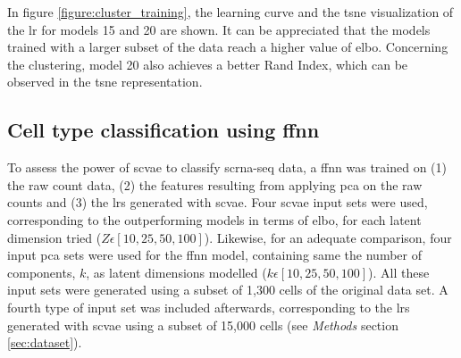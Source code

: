 \documentclass{article}
\begin{document}
\noindent In figure \ref{figure:cluster_training}, the learning curve and the \gls{tsne} visualization of the \gls{lr} for models 15 and 20 are shown. 
It can be appreciated that the models trained with a larger subset of the data reach a higher value of \gls{elbo}. 
Concerning the clustering, model 20 also achieves a better Rand Index, which can be observed in the \gls{tsne} representation.\\






\subsection{Cell type classification using \gls{ffnn}}
\label{sec:results_ffnn}

\noindent To assess the power of \gls{scvae} to classify \gls{scrna-seq} data, a \gls{ffnn} was trained on (1) the raw count data, (2) the features resulting from applying \gls{pca} on the raw counts and (3) the \glspl{lr} generated with \gls{scvae}.
Four \gls{scvae} input sets were used, corresponding to the outperforming models in terms of \gls{elbo}, for each latent dimension tried ($Z\epsilon[10, 25, 50, 100]$). 
Likewise, for an adequate comparison, four input \gls{pca} sets were used for the \gls{ffnn} model, containing same the number of components, $k$, as latent dimensions modelled ($k\epsilon[10, 25, 50, 100]$).
All these input sets were generated using a subset of 1,300 cells of the original data set. 
A fourth type of input set was included afterwards, corresponding to the \glspl{lr} generated with \gls{scvae} using a subset of 15,000 cells (see \textit{Methods} section \ref{sec:dataset}).\\
\end{document}

